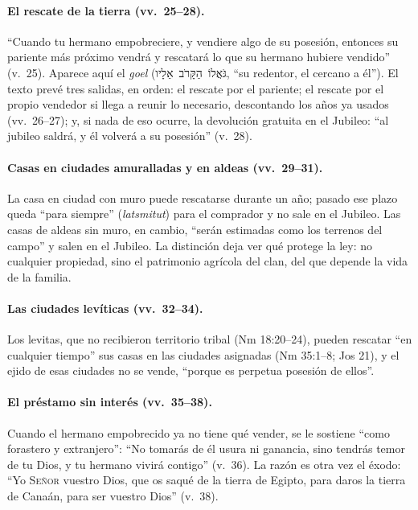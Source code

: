 \documentclass[11pt,letterpaper]{article}
\newcommand{\heb}[1]{\mbox{\foreignlanguage{hebrew}{#1}}}
\newcommand{\SENOR}{\textsc{Señor}}
\begin{document}
\paragraph{El rescate de la tierra (vv.~25--28).} ``Cuando tu hermano empobreciere, y vendiere algo de su posesión, entonces su pariente más próximo vendrá y rescatará lo que su hermano hubiere vendido'' (v.~25). Aparece aquí el \emph{goel} (\heb{גֹּאֲלוֹ הַקָּרֹב אֵלָיו}, ``su redentor, el cercano a él''). El texto prevé tres salidas, en orden: el rescate por el pariente; el rescate por el propio vendedor si llega a reunir lo necesario, descontando los años ya usados (vv.~26--27); y, si nada de eso ocurre, la devolución gratuita en el Jubileo: ``al jubileo saldrá, y él volverá a su posesión'' (v.~28).

\paragraph{Casas en ciudades amuralladas y en aldeas (vv.~29--31).} La casa en ciudad con muro puede rescatarse durante un año; pasado ese plazo queda ``para siempre'' (\emph{latsmitut}) para el comprador y no sale en el Jubileo. Las casas de aldeas sin muro, en cambio, ``serán estimadas como los terrenos del campo'' y salen en el Jubileo. La distinción deja ver qué protege la ley: no cualquier propiedad, sino el patrimonio agrícola del clan, del que depende la vida de la familia.

\paragraph{Las ciudades levíticas (vv.~32--34).} Los levitas, que no recibieron territorio tribal (Nm 18:20--24), pueden rescatar ``en cualquier tiempo'' sus casas en las ciudades asignadas (Nm 35:1--8; Jos 21), y el ejido de esas ciudades no se vende, ``porque es perpetua posesión de ellos''.

\paragraph{El préstamo sin interés (vv.~35--38).} Cuando el hermano empobrecido ya no tiene qué vender, se le sostiene ``como forastero y extranjero'': ``No tomarás de él usura ni ganancia, sino tendrás temor de tu Dios, y tu hermano vivirá contigo'' (v.~36). La razón es otra vez el éxodo: ``Yo \SENOR{} vuestro Dios, que os saqué de la tierra de Egipto, para daros la tierra de Canaán, para ser vuestro Dios'' (v.~38).
\end{document}
